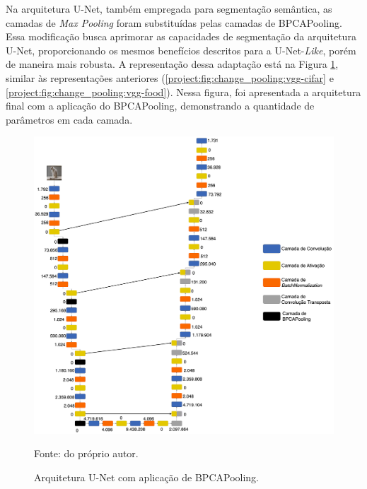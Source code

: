 Na arquitetura U-Net, também empregada para segmentação semântica, as camadas de \textit{Max Pooling} foram substituídas pelas camadas de BPCAPooling. Essa modificação busca aprimorar as capacidades de segmentação da arquitetura U-Net, proporcionando os mesmos benefícios descritos para a U-Net-\textit{Like}, porém de maneira mais robusta. A representação dessa adaptação está na Figura \ref{project:fig:change_pooling:unet}, similar às representações anteriores (\ref{project:fig:change_pooling:vgg-cifar} e \ref{project:fig:change_pooling:vgg-food}). Nessa figura, foi apresentada a arquitetura final com a aplicação do BPCAPooling, demonstrando a quantidade de parâmetros em cada camada.

\begin{figure}[H]
    \centering
    \caption{Arquitetura U-Net com aplicação de BPCAPooling.}
    \includegraphics[width=1\textwidth]{recursos/imagens/project/unet-with-bpca.png}
    \label{project:fig:change_pooling:unet}

    Fonte: do próprio autor.
\end{figure}

